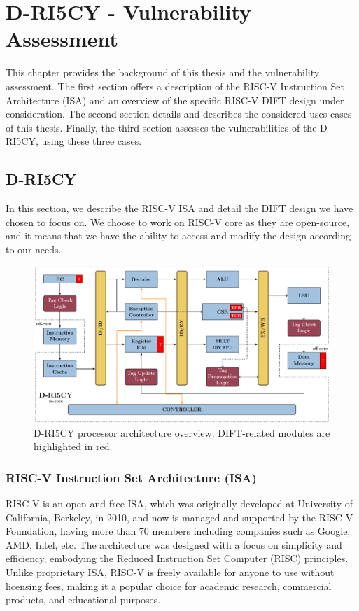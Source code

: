 \chapter{D-RI5CY - Vulnerability Assessment}
\label{chapter:dift_assessment}
\minitoc

This chapter provides the background of this thesis and the vulnerability assessment. The first section offers a description of the RISC-V Instruction Set Architecture (ISA) and an overview of the specific RISC-V DIFT design under consideration.
The second section details and describes the considered uses cases of this thesis.
Finally, the third section assesses the vulnerabilities of the D-RI5CY, using these three cases.

\section{D-RI5CY}
\label{section:driscy}
In this section, we describe the RISC-V ISA and detail the DIFT design we have chosen to focus on.
We choose to work on RISC-V core as they are open-source, and it means that we have the ability to access and modify the design according to our needs.

\begin{figure}[t]
    \centering
    \includegraphics[width=\textwidth]{c3_vulnerabilities_assessment/img/RI5CY.pdf}
    \caption{D-RI5CY processor architecture overview. DIFT-related modules are highlighted in red.}
    \label{fig:driscy}
\end{figure}

\subsection{RISC-V Instruction Set Architecture (ISA)}
RISC-V is an open and free ISA, which was originally developed at University of California, Berkeley, in 2010, and now is managed and supported by the RISC-V Foundation, having more than 70 members including companies such as Google, AMD, Intel, etc. The architecture was designed with a focus on simplicity and efficiency, embodying the Reduced Instruction Set Computer (RISC) principles. Unlike proprietary ISA, RISC-V is freely available for anyone to use without licensing fees, making it a popular choice for academic research, commercial products, and educational purposes.

